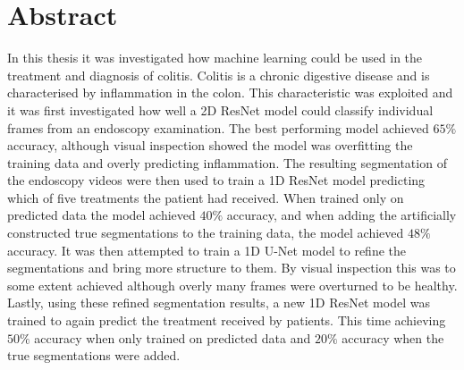 \section{Abstract}
In this thesis it was investigated how machine learning could be used in the treatment and diagnosis of colitis. Colitis is a chronic digestive disease and is characterised by inflammation in the colon. This characteristic was exploited and it was first investigated how well a 2D ResNet model could classify individual frames from an endoscopy examination. The best performing model achieved $65\%$ accuracy, although visual inspection showed the model was overfitting the training data and overly predicting inflammation. The resulting segmentation of the endoscopy videos were then used to train a 1D ResNet model predicting which of five treatments the patient had received. When trained only on predicted data the model achieved $40\%$ accuracy, and when adding the artificially constructed true segmentations to the training data, the model achieved $48\%$ accuracy. It was then attempted to train a 1D U-Net model to refine the segmentations and bring more structure to them. By visual inspection this was to some extent achieved although overly many frames were overturned to be healthy. Lastly, using these refined segmentation results, a new 1D ResNet model was trained to again predict the treatment received by patients. This time achieving $50\%$ accuracy when only trained on predicted data and $20\%$ accuracy when the true segmentations were added.